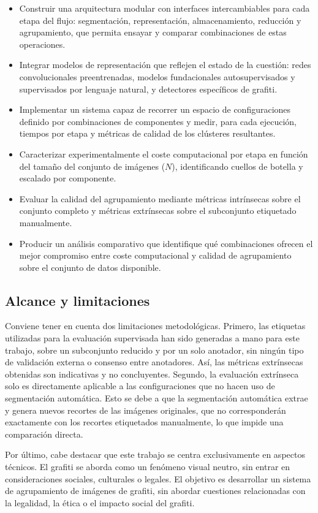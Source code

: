 \begin{itemize}
    \item Construir una arquitectura modular con interfaces intercambiables
        para cada etapa del flujo: segmentación, representación,
        almacenamiento, reducción y agrupamiento, que permita ensayar y
        comparar combinaciones de estas operaciones.
    \item Integrar modelos de representación que reflejen el estado de la
        cuestión: redes convolucionales preentrenadas, modelos fundacionales
        autosupervisados y supervisados por lenguaje natural, y detectores
        específicos de grafiti.
    \item Implementar un sistema capaz de recorrer un espacio de configuraciones
        definido por combinaciones de componentes y medir, para cada ejecución, 
        tiempos por etapa y métricas de calidad de los clústeres resultantes.
    \item Caracterizar experimentalmente el coste computacional por etapa en
        función del tamaño del conjunto de imágenes ($N$), identificando
        cuellos de botella y escalado por componente.
    \item Evaluar la calidad del agrupamiento mediante métricas intrínsecas
        sobre el conjunto completo y métricas extrínsecas sobre el subconjunto
        etiquetado manualmente.
    \item Producir un análisis comparativo que identifique qué combinaciones
        ofrecen el mejor compromiso entre coste computacional y calidad de
        agrupamiento sobre el conjunto de datos disponible.
\end{itemize}

\subsection{Alcance y limitaciones}
\label{subsec:intro-alcance}

Conviene tener en cuenta dos limitaciones metodológicas. Primero, las etiquetas
utilizadas para la evaluación supervisada han sido generadas a mano para este
trabajo, sobre un subconjunto reducido y por un solo anotador, sin ningún tipo
de validación externa o consenso entre anotadores. Así, las métricas
extrínsecas obtenidas son indicativas y no concluyentes. Segundo, la evaluación
extrínseca solo es directamente aplicable a las configuraciones que no hacen
uso de segmentación automática. Esto se debe a que la segmentación automática
extrae y genera nuevos recortes de las imágenes originales, que no
corresponderán exactamente con los recortes etiquetados manualmente, lo que
impide una comparación directa.

Por último, cabe destacar que este trabajo se centra exclusivamente en aspectos
técnicos. El grafiti se aborda como un fenómeno visual neutro, sin entrar en
consideraciones sociales, culturales o legales. El objetivo es desarrollar un
sistema de agrupamiento de imágenes de grafiti, sin abordar cuestiones
relacionadas con la legalidad, la ética o el impacto social del grafiti.

